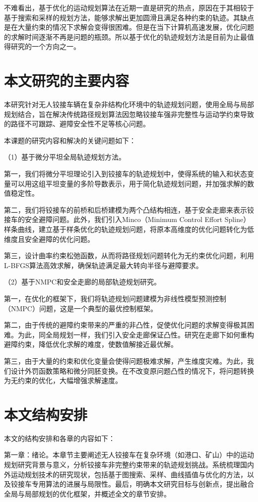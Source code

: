 \documentclass[master,academic]{ysuthesis} %
\begin{document}
	不难看出，基于优化的运动规划算法在近期一直是研究的热点，原因在于其相较于基于搜索和采样的规划方法，能够求解出更加圆滑且满足各种约束的轨迹。其缺点是在大量约束的情况下求解会变得很困难。但是在当下计算机高速发展，优化问题的求解时间逐渐不再是问题的瓶颈。所以基于优化的轨迹规划方法是目前为止最值得研究的一个方向之一。

	\section{本文研究的主要内容}
	本研究针对无人铰接车辆在复杂非结构化环境中的轨迹规划问题，使用全局与局部规划结合，旨在解决传统路径规划算法因忽略铰接车强非完整性与运动学约束导致的路径不可跟踪、避障安全性不足等核心问题。

	本课题的研究内容和解决的关键问题如下：

	（1）基于微分平坦全局轨迹规划方法。

	第一，我们将微分平坦理论引入到铰接车的轨迹规划中，使得系统的输入和状态变量可以用这组平坦变量的多阶导数表示，用于简化轨迹规划问题，并加强求解的数值稳定性。
	
	第二，我们将铰接车的前桥和后桥建模为两个凸结构相连，基于安全走廊来表示铰接车的安全避障问题。此外，我们引入Minco（Minimum Control Effort Spline）样条曲线，建立基于样条优化的轨迹规划问题，将原本高维度的优化问题转化为低维度且安全避障的优化问题。

	第三，设计曲率约束松弛函数，从而将路径规划问题转化为无约束优化问题，利用L-BFGS算法高效求解，确保轨迹满足最大转向半径与避障要求。

	（2）基于NMPC和安全走廊的局部轨迹规划研究。

	第一，在优化的框架下，我们将轨迹规划问题建模为非线性模型预测控制（NMPC）问题，这是一个典型的最优控制框架。
	
	第二，由于传统的避障约束带来的严重的非凸性，促使优化问题的求解变得极其困难。为此，同全局规划一样，我们引入安全走廊保证凸性。研究在走廊下如何重构避障约束，降低优化求解的难度，使数值解接近最优解。
	
	第三，由于大量的约束和优化变量会使得问题极难求解，产生维度灾难。为此，我们设计外罚函数策略和微分同胚变换。在不改变原问题凸性的情况下，将问题转换为无约束的优化，大幅增强求解速度。

	\section{本文结构安排}
	本文的结构安排和各章的内容如下：

	第一章：绪论。本章节主要阐述无人铰接车在复杂环境（如港口、矿山）中的运动规划研究背景与意义，分析铰接车非完整约束带来的轨迹规划挑战。系统梳理国内外运动规划技术的研究现状，包括基于图搜索、采样、曲线插值与优化的方法，以及铰接车专用算法的进展与局限性。最后，明确本文研究目标与创新点，提出融合全局与局部规划的优化框架，并概述全文的章节安排。
\end{document}
